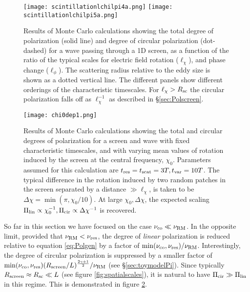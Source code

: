 \documentclass[fleqn,usenatbib]{mnras}
\begin{document}
	\begin{figure}
		\centering
		\texttt{[image: scintillationlchilpi4a.png]}
		\texttt{[image: scintillationlchilpi5a.png]}
		\caption{Results of Monte Carlo calculations showing the total degree of polarization (solid line) and degree of circular polarization (dot-dashed) for a wave passing through a 1D screen, as a function of the ratio of the typical scales for electric field rotation ($\ell_{\chi}$), and phase change ($\ell_{\phi}$). The scattering radius relative to the eddy size is shown as a dotted vertical line. The different panels show different orderings of the characteristic timescales. For $\ell_{\chi}>R_{\rm sc}$ the circular polarization falls off as $\ell_{\chi}^{-1}$ as described in \S \ref{sec:Polscreen}.}
		\label{fig:lchilpi}
	\end{figure}
	
	
	\begin{figure}
		\centering
		\texttt{[image: chi0dep1.png]}
		\caption{ Results of Monte Carlo calculations showing the total and circular degrees of polarization for a screen and wave with fixed characteristic timescales, and with varying mean values of rotation induced by the screen at the central frequency, $\chi_0$. Parameters assumed for this calculation are $t_{\rm res}=t_{\rm scat}=3T, t_{\rm var}=10T$. The typical difference in the rotation induced by two random patches in the screen separated by a distance $\gg \ell_{\chi}$, is taken to be $\Delta \chi=\min(\pi,\chi_0/10)$. At large $\chi_0,\Delta \chi$, the expected scaling $\Pi_{\rm lin}\propto \chi_0^{-1},\Pi_{\rm cir}\propto \Delta \chi^{-1}$ is recovered.}
		\label{fig:chi0dep}
	\end{figure}
	
	So far in this section we have focused on the case $\nu_{\rm co}\ll\nu_{\rm RM}$. In the opposite limit, provided that $\nu_{\rm RM}<\nu_{\rm res}$, the degree of {\it linear} polarization is reduced relative to equation \ref{eq:Polgen} by a factor of $\min(\nu_{\rm co},\nu_{\rm res})/\nu_{\rm RM}$. Interestingly, the degree of circular polarization is suppressed by a smaller factor of $\min(\nu_{\rm co},\nu_{\rm res})(R_{\rm screen}/L)^{2\gamma+1\over 2}/\nu_{\rm RM}$ (see \S \ref{sec:toymodelPi}). Since typically $R_{\rm screen}\approx R_{\rm sc}\ll L$ (see figure \ref{fig:spatialscales}), it is natural to have $\Pi_{\rm cir}\gg \Pi_{\rm lin}$ in this regime. This is demonstrated in figure \ref{fig:chi0dep}.
	
\end{document}
